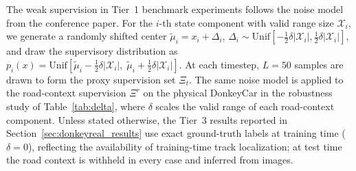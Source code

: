 \documentclass[preprint,12pt]{elsarticle}
\begin{document}
The weak supervision in Tier~1 benchmark experiments follows the noise model from
the conference paper.
For the $i$-th state component with valid range size $\mathcal{X}_i$, we generate a
randomly shifted center $\tilde{\mu}_i = x_i + \Delta_i$,
$\Delta_i \sim \mathrm{Unif}[-\frac{1}{2}\delta|\mathcal{X}_i|,
\frac{1}{2}\delta|\mathcal{X}_i|]$, and draw the supervisory distribution as
$p_i(x) = \mathrm{Unif}[\tilde{\mu}_i - \frac{1}{2}\delta|\mathcal{X}_i|,\;
\tilde{\mu}_i + \frac{1}{2}\delta|\mathcal{X}_i|]$.
At each timestep, $L = 50$ samples are drawn to form the proxy supervision set
$\Xi_t$.
The same noise model is applied to the road-context supervision $\Xi^r$ on the
physical DonkeyCar in the robustness study of Table~\ref{tab:delta}, where
$\delta$ scales the valid range of each road-context component.
Unless stated otherwise, the Tier~3 results reported in
Section~\ref{sec:donkeyreal_results} use exact ground-truth labels at training
time ($\delta = 0$), reflecting the availability of training-time track
localization; at test time the road context is withheld in every case and
inferred from images.



\end{document}
